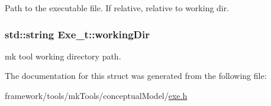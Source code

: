 Path to the executable file. If relative, relative to working dir. 

\subsubsection[{\texorpdfstring{working\+Dir}{workingDir}}]{\setlength{\rightskip}{0pt plus 5cm}std\+::string Exe\+\_\+t\+::working\+Dir}\hypertarget{struct_exe__t_aabb64244de93a7b0f75134a12c445874}{}\label{struct_exe__t_aabb64244de93a7b0f75134a12c445874}


mk tool working directory path. 



The documentation for this struct was generated from the following file\+:\begin{DoxyCompactItemize}
\item 
framework/tools/mk\+Tools/conceptual\+Model/\hyperlink{exe_8h}{exe.\+h}\end{DoxyCompactItemize}
